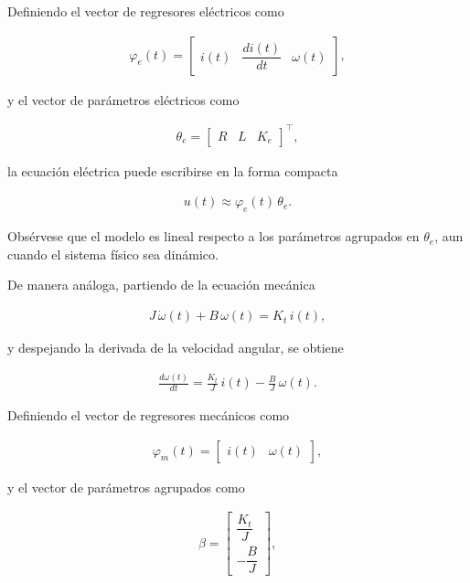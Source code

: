Definiendo el vector de regresores eléctricos como

\begin{align*}
    \varphi_e(t) =
    \begin{bmatrix}
    i(t) & \dfrac{di(t)}{dt} & \omega(t)
    \end{bmatrix},
\end{align*}

y el vector de parámetros eléctricos como

\begin{align*}
    \theta_e =
    \begin{bmatrix}
    R & L & K_e
    \end{bmatrix}^{\top},
\end{align*}

la ecuación eléctrica puede escribirse en la forma compacta

\begin{align*}
    u(t) \approx \varphi_e(t)\,\theta_e.
\end{align*}

Obsérvese que el modelo es lineal respecto a los parámetros agrupados en 
$\theta_e$, aun cuando el sistema físico sea dinámico.

De manera análoga, partiendo de la ecuación mecánica 

\begin{align*}
    J\,\dot{\omega}(t) + B\,\omega(t) = K_t\,i(t),
\end{align*}

y despejando la derivada de la velocidad angular, se obtiene

\begin{align*}
    \frac{d\omega(t)}{dt} =
    \frac{K_t}{J}\, i(t) - \frac{B}{J}\, \omega(t).
\end{align*}

Definiendo el vector de regresores mecánicos como

\begin{align*}
    \varphi_m(t) =
    \begin{bmatrix}
    i(t) & \omega(t)
    \end{bmatrix},    
\end{align*}

y el vector de parámetros agrupados como


\begin{align*}
    \beta =
    \begin{bmatrix}
    \dfrac{K_t}{J} \\[6pt]
    -\dfrac{B}{J}
    \end{bmatrix},
\end{align*}


